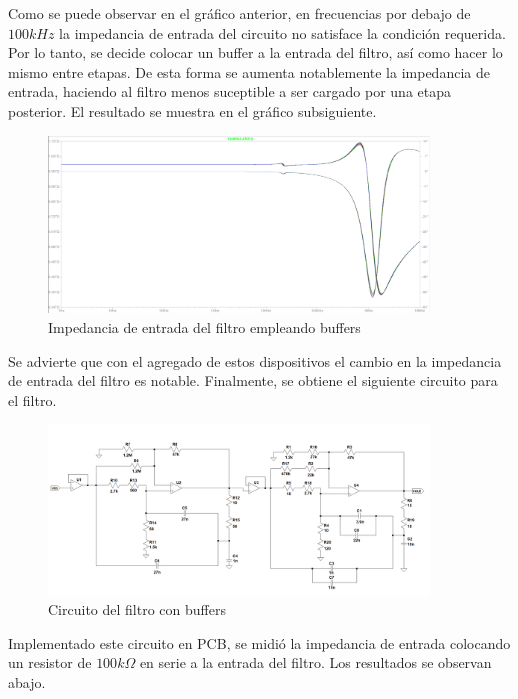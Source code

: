Como se puede observar en el gr\'afico anterior, en frecuencias por debajo de $100kHz$ la impedancia de entrada del circuito no satisface la condici\'on requerida. Por lo tanto, se decide colocar un buffer a la entrada del filtro, as\'i como hacer lo mismo entre etapas. De esta forma se aumenta notablemente la impedancia de entrada, haciendo al filtro menos suceptible a ser cargado por una etapa posterior. El resultado se muestra en el gr\'afico subsiguiente.

\begin{figure}[H]
    \centering
    \includegraphics[width=0.9\textwidth]{../EJ3/Resources/zin_buffered.png}
    \caption{Impedancia de entrada del filtro empleando buffers}
     \label{EJ3_FILTER_ZIN_BUFFERED}
\end{figure}

Se advierte que con el agregado de estos dispositivos el cambio en la impedancia de entrada del filtro es notable. Finalmente, se obtiene el siguiente circuito para el filtro.


\begin{figure}[H]
    \centering
    \includegraphics[width=0.9\textwidth]{../EJ3/Resources/filter_buffered.png}
    \caption{Circuito del filtro con buffers}
     \label{EJ3_FILTER_CIRCUIT_BUFFERED}
\end{figure}

Implementado este circuito en PCB, se midi\'o la impedancia de entrada colocando un resistor de $100k\Omega$ en serie a la entrada del filtro. Los resultados se observan abajo.

